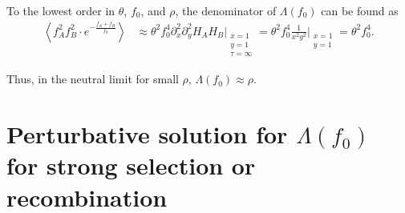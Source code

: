 \documentclass[11pt]{article}
\begin{document}


To the lowest order in $\theta$, $f_0$, and $\rho$, the denominator of $\Lambda(f_0)$ can be found as 
\begin{align}
    \left\langle f_A^2f_B^2\cdot e^{-\frac{f_{A}+f_{B}}{f_0}}\right\rangle &\approx \theta^2 f_0^4 \partial_x^2 \partial_y^2 H_A H_B \Bigg\vert_{\substack{x=1 \\ y=1 \\ \tau=\infty}} = \theta^2 f_0^4 \frac{1}{x^2y^2}\Bigg\vert_{\substack{x=1 \\ y=1}} = \theta^2 f_0^4.
\end{align}

Thus, in the neutral limit for small $\rho$, $\Lambda(f_0) \approx \rho$.

\section*{Perturbative solution for $\Lambda(f_0)$ for strong selection or recombination}
\end{document}
